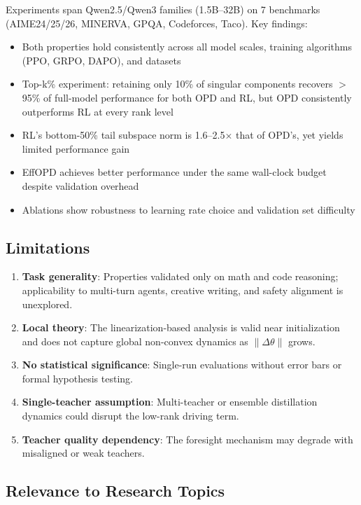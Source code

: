 \documentclass[11pt,a4paper]{article}
\begin{document}
Experiments span Qwen2.5/Qwen3 families (1.5B--32B) on 7 benchmarks (AIME24/25/26, MINERVA, GPQA, Codeforces, Taco). Key findings:
\begin{itemize}[nosep]
\item Both properties hold consistently across all model scales, training algorithms (PPO, GRPO, DAPO), and datasets
\item Top-k\% experiment: retaining only 10\% of singular components recovers $>$95\% of full-model performance for both OPD and RL, but OPD consistently outperforms RL at every rank level
\item RL's bottom-50\% tail subspace norm is 1.6--2.5$\times$ that of OPD's, yet yields limited performance gain
\item EffOPD achieves better performance under the same wall-clock budget despite validation overhead
\item Ablations show robustness to learning rate choice and validation set difficulty
\end{itemize}

\subsection{Limitations}

\begin{enumerate}[nosep]
\item \textbf{Task generality}: Properties validated only on math and code reasoning; applicability to multi-turn agents, creative writing, and safety alignment is unexplored.
\item \textbf{Local theory}: The linearization-based analysis is valid near initialization and does not capture global non-convex dynamics as $\|\Delta\theta\|$ grows.
\item \textbf{No statistical significance}: Single-run evaluations without error bars or formal hypothesis testing.
\item \textbf{Single-teacher assumption}: Multi-teacher or ensemble distillation dynamics could disrupt the low-rank driving term.
\item \textbf{Teacher quality dependency}: The foresight mechanism may degrade with misaligned or weak teachers.
\end{enumerate}

\subsection{Relevance to Research Topics}
\end{document}
